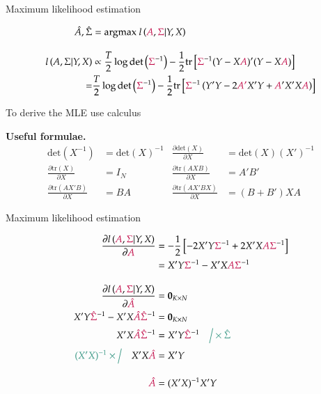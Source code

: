\documentclass[notes,blackandwhite,mathsans,usenames,dvipsnames]{beamer}
\begin{document}
\begin{frame}{Maximum likelihood estimation}

\begin{align*} 
\hat{A},\hat\Sigma &= \text{argmax } l\left( {\color{purple}A},{\color{purple}\Sigma}|Y,X \right)\\[2ex]
l\left( A,\Sigma|Y,X \right) &\propto \frac{T}{2}\log\text{det}\left({\color{purple}\Sigma}^{-1}\right)  -\frac{1}{2}\text{tr}\left[ {\color{purple}\Sigma}^{-1}(Y-X{\color{purple}A})'(Y-X{\color{purple}A}) \right] \\
=& \frac{T}{2}\log\text{det}\left({\color{purple}\Sigma}^{-1}\right)  -\frac{1}{2}\text{tr}\left[ {\color{purple}\Sigma}^{-1}\left(Y'Y-2{\color{purple}A'}X'Y + {\color{purple}A}'X'X{\color{purple}A}\right) \right] 
\end{align*}

{\color{mcxs2}To derive the} {\color{mcxs1}MLE} {\color{mcxs2}use calculus}

\bigskip\textbf{Useful formulae.}\footnotesize
\begin{align*}
\text{det}\left(X^{-1}\right) &= \text{det}\left(X\right)^{-1} & \frac{\partial\text{det}(X)}{\partial X} &= \text{det}(X)(X')^{-1}\\[1ex]
\frac{\partial\text{tr}(X)}{\partial X} &= I_N&
\frac{\partial\text{tr}(AXB)}{\partial X} &= A'B'\\[1ex]
\frac{\partial\text{tr}(AX'B)}{\partial X} &= BA&
\frac{\partial\text{tr}(AX'BX)}{\partial X} &= (B+B')XA
\end{align*}
\end{frame}





\begin{frame}{Maximum likelihood estimation}

\begin{align*} 
\frac{\partial l\left( {\color{purple}A},{\color{purple}\Sigma}|Y,X \right)}{\partial {\color{purple}A}} &= -\frac{1}{2}\left[ -2X'Y{\color{purple}\Sigma}^{-1}  + 2X'X{\color{purple}A}{\color{purple}\Sigma}^{-1} \right]\\
&= X'Y{\color{purple}\Sigma}^{-1}- X'X{\color{purple}A}{\color{purple}\Sigma}^{-1} \\[2ex]
\frac{\partial l\left( {\color{purple}A},{\color{purple}\Sigma}|Y,X \right)}{\partial {\color{purple}\hat{A}}} &= \mathbf{0}_{K\times N}\\
X'Y{\color{purple}\hat\Sigma}^{-1}- X'X{\color{purple}\hat{A}}{\color{purple}\hat\Sigma}^{-1} &= \mathbf{0}_{K\times N}\\
 X'X{\color{purple}\hat{A}}{\color{purple}\hat\Sigma}^{-1} &= X'Y{\color{purple}\hat\Sigma}^{-1} \quad{\color{mcxs2}\Big/\times\hat\Sigma}\\
{\color{mcxs2}(X'X)^{-1} \times\Big/}\quad X'X{\color{purple}\hat{A}} &= X'Y\\[2ex]
{\color{purple}\hat{A}} &= (X'X)^{-1}X'Y 
\end{align*}

\end{frame}
\end{document}
